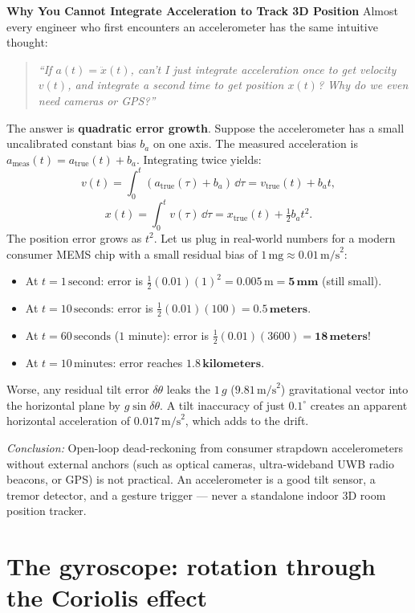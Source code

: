 \begin{trapbox}
\textbf{Why You Cannot Integrate Acceleration to Track 3D Position}
Almost every engineer who first encounters an accelerometer has the same intuitive thought:
\begin{quote}
  \emph{``If $a(t) = \ddot{x}(t)$, can't I just integrate acceleration once to get velocity $v(t)$, and integrate a second time to get position $x(t)$? Why do we even need cameras or GPS?''}
\end{quote}
The answer is \textbf{quadratic error growth}. Suppose the accelerometer has a small uncalibrated constant bias $b_a$ on one axis. The measured acceleration is $a_{\text{meas}}(t) = a_{\text{true}}(t) + b_a$. Integrating twice yields:
\[
  v(t) = \int_0^t (a_{\text{true}}(\tau) + b_a)\,\dd\tau = v_{\text{true}}(t) + b_a t,
\]
\[
  x(t) = \int_0^t v(\tau)\,\dd\tau = x_{\text{true}}(t) + \tfrac{1}{2} b_a t^2.
\]
The position error grows as \textbf{$t^2$}. Let us plug in real-world numbers for a modern consumer MEMS chip with a small residual bias of $1\,\text{mg} \approx 0.01\,\text{m/s}^2$:
\begin{itemize}
  \item At $t = 1\,\text{second}$: error is $\frac{1}{2}(0.01)(1)^2 = 0.005\,\text{m} = \mathbf{5\,\text{mm}}$ (still small).
  \item At $t = 10\,\text{seconds}$: error is $\frac{1}{2}(0.01)(100) = \mathbf{0.5\,\text{meters}}$.
  \item At $t = 60\,\text{seconds}$ ($1$ minute): error is $\frac{1}{2}(0.01)(3600) = \mathbf{18\,\text{meters}}$!
  \item At $t = 10\,\text{minutes}$: error reaches $\mathbf{1.8\,\text{kilometers}}$.
\end{itemize}
Worse, any residual tilt error $\delta\theta$ leaks the $1\,g$ ($9.81\,\text{m/s}^2$) gravitational vector into the horizontal plane by $g \sin \delta\theta$. A tilt inaccuracy of just $0.1^\circ$ creates an apparent horizontal acceleration of $0.017\,\text{m/s}^2$, which adds to the drift. 

\emph{Conclusion:} Open-loop dead-reckoning from consumer strapdown accelerometers without external anchors (such as optical cameras, ultra-wideband UWB radio beacons, or GPS) is not practical. An accelerometer is a good tilt sensor, a tremor detector, and a gesture trigger --- never a standalone indoor 3D room position tracker.
\end{trapbox}

\section{The gyroscope: rotation through the Coriolis effect}
\label{ch34:gyro}

